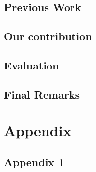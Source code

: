 \documentclass[oneside,openany,titlepage,numbers=noenddot,headinclude,footinclude=true,cleardoublepage=empty,listof=totoc,paper=a4,fontsize=11pt,australian,twoside=semi,DIV=calc]{scrreprt}
\begin{document}
  \chapter{Previous Work}\label{c:Related-Works}
  
  \acresetall 
  \chapter{Our contribution}\label{c:Contribution-1}
  
  \acresetall 
  \chapter{Evaluation}\label{c:Experiments}
  
\acresetall 
  \chapter{Final Remarks}\label{c:Conclusions}
  
  \acresetall 
\begin{comment}
  \chapter{Final Remarks}\label{c:Conclusions}
  
\end{comment}

  \cleardoublepage

\part{Appendix}

  \appendix
 \chapter{Appendix 1}\label{app:A}
  \acresetall 
  
  \acresetall 
\begin{comment}
  \chapter{Appendix 2}\label{app:B}
  
\end{comment}
  
  \singlespacing
  
  \cleardoublepage
  
  \pagestyle{empty}
  \onehalfspacing
  
\end{document}
